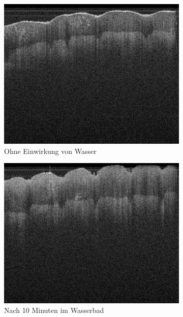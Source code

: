 \documentclass[german, %
parskip=full, %
bibliography=totoc, %
]{scrartcl}
\begin{document}
\begin{figure}[ht]
	\centering
	\begin{subfigure}[b]{0.3\textwidth}
	   \includegraphics[width=\textwidth]{finger_uncreme_1}
		 \caption{Ohne Einwirkung von Wasser}
	\end{subfigure}
	\begin{subfigure}[b]{0.3\textwidth}
	   \includegraphics[width=\textwidth]{finger_uncreme_2}
		 \caption{Nach 10 Minuten im Wasserbad}
	\end{subfigure}
	\begin{subfigure}[b]{0.3\textwidth}

\end{subfigure}
\end{figure}
\end{document}

